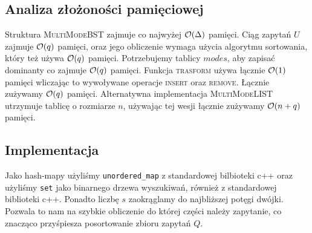 \subsection{Analiza złożoności pamięciowej}
Struktura \textsc{MultiModeBST} zajmuje co najwyżej $\mathcal{O}(\Delta)$ pamięci. Ciąg zapytań $U$ zajmuje $\mathcal{O}(q)$ pamięci, oraz jego obliczenie wymaga użycia algorytmu sortowania, który też używa $\mathcal{O}(q)$ pamięci. Potrzebujemy tablicy $modes$, aby zapisać dominanty co zajmuje $\mathcal{O}(q)$ pamięci. Funkcja \textsc{trasform} używa łącznie $\mathcal{O}(1)$ pamięci wliczając to wywoływane operacje \textsc{insert} oraz \textsc{remove}. Łącznie zużywamy $\mathcal{O}(q)$ pamięci. Alternatywna implementacja \textsc{MultiModeLIST} utrzymuje tablicę o rozmiarze $n$, używając tej wesji łącznie zużywamy $\mathcal{O}(n+q)$ pamięci.

\subsection{Implementacja}
Jako hash-mapy użyliśmy \lstinline{unordered_map} z standardowej bilbioteki c++ oraz użyliśmy \lstinline{set} jako binarnego drzewa wyszukiwań, również z standardowej biblioteki c++. Ponadto liczbę $s$ zaokrąglamy do najbliższej potęgi dwójki. Pozwala to nam na szybkie obliczenie do której części należy zapytanie, co znacząco przyśpiesza posortowanie zbioru zapytań $Q$.
\newpage